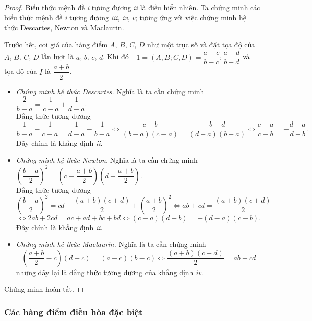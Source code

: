         \begin{proof}
            Biểu thức mệnh đề \textit{i} tương đương \textit{ii} là điều hiển nhiên. Ta chứng minh các biểu thức mệnh đề \textit{i} tương đương \textit{iii}, \textit{iv}, \textit{v}; tương ứng với việc chứng minh hệ thức Descartes, Newton và Maclaurin.

            Trước hết, coi giá của hàng điểm \(A\), \(B\), \(C\), \(D\) như một trục số và đặt tọa độ của \(A\), \(B\), \(C\), \(D\) lần lượt là \(a\), \(b\), \(c\), \(d\). Khi đó \(-1 = (A,B;C,D) = \dfrac{a - c}{b - c} : \dfrac{a - d}{b - d}\) và tọa độ của \(I\) là \(\dfrac{a + b}{2}\).

            \begin{itemize}
                \item \textit{Chứng minh hệ thức Descartes.} Nghĩa là ta cần chứng minh \(\dfrac{2}{b - a} = \dfrac{1}{c - a} + \dfrac{1}{d - a}\). \\ Đẳng thức tương đương
                \[\frac{1}{b - a} - \frac{1}{c - a} = \frac{1}{d - a} - \frac{1}{b - a} \Leftrightarrow \frac{c - b}{(b - a)(c - a)} = \frac{b - d}{(d - a)(b - a)} \Leftrightarrow \frac{c - a}{c - b} = -\frac{d - a}{d - b}.\]
                Đây chính là khẳng định \textit{ii}.

                \item \textit{Chứng minh hệ thức Newton.} Nghĩa là ta cần chứng minh \(\left(\dfrac{b - a}{2}\right)^2 = \left(c - \dfrac{a + b}{2}\right)\left(d - \dfrac{a + b}{2}\right)\). \\ Đẳng thức tương đương
                \[\left(\frac{b - a}{2}\right)^2 = cd - \frac{(a + b)(c + d)}{2} + \left(\frac{a + b}{2}\right)^2 \Leftrightarrow ab + cd = \frac{(a + b)(c + d)}{2}\]
                \[\Leftrightarrow 2ab + 2cd = ac + ad + bc + bd \Leftrightarrow (c - a)(d - b) = -(d - a)(c - b).\]
                Đây chính là khẳng định \textit{ii}.

                \item \textit{Chứng minh hệ thức Maclaurin.} Nghĩa là ta cần chứng minh 
                \[\left(\frac{a + b}{2} - c\right)(d - c) = (a - c)(b - c) \Leftrightarrow \frac{(a + b)(c + d)}{2} = ab + cd\]
                nhưng đây lại là đẳng thức tương đương của khẳng định \textit{iv}.
            \end{itemize}
            Chứng minh hoàn tất.
        \end{proof}

    \subsubsection*{Các hàng điểm điều hòa đặc biệt}


